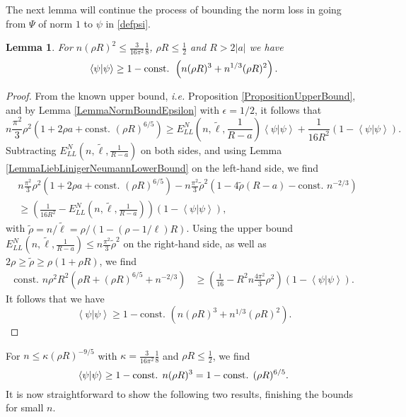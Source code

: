 \documentclass[a4paper,11pt]{article}
\newcommand{\abs}[1]{\left\lvert #1 \right\rvert}
\renewcommand{\braket}[1]{\left\langle#1\right\rangle}
\newcommand{\ie}{\emph{i.e.} }
\newtheorem{lemma}[theorem]{Lemma}
\numberwithin{equation}{section}
\begin{document}
	
	The next lemma will continue the process of bounding the norm loss in going from $ \Psi $ of norm $ 1 $ to $ \psi $ in \eqref{defpsi}. 
	\begin{lemma}\label{LemmaImprovedMassBound}
		For $ n(\rho R)^2\leq  \frac{3}{16\pi^2}\frac{1}{8} $, $ \rho R\leq \frac{1}{2} $ and $ R>2\abs{a} $ we have
		\begin{equation}\label{EqImprovedMassBound}
			\begin{aligned}
				\braket{\psi|\psi} \geq 1-\textnormal{const. }\left(n(\rho R)^3+n^{1/3}(\rho R)^2\right).
			\end{aligned}
		\end{equation}
	\end{lemma}
	\begin{proof}
		From the known upper bound, \ie Proposition \ref{PropositionUpperBound}, and by Lemma \ref{LemmaNormBoundEpsilon} with $ \epsilon=1/2 $, it follows that 
		\begin{equation}
			n\frac{\pi^2}{3}\rho^2\left(1+2\rho a+\text{const. }(\rho R)^{6/5}\right)\geq E_{LL}^N \left(n,\tilde{\ell},\frac{1}{R-a}\right)\braket{\psi|\psi}+ \frac{1}{16R^2}(1-\braket{\psi|\psi}).
		\end{equation}
		Subtracting $ E_{LL}^N \left(n,\tilde{\ell},\frac{1}{R-a}\right) $ on both sides, and using Lemma \ref{LemmaLiebLinigerNeumannLowerBound} on the left-hand side, we find\begin{equation}
			\begin{aligned}
				&n\frac{\pi^2}{3}\rho^2\left(1+2\rho a+\text{const. }(\rho R)^{6/5}\right)-n\frac{\pi^2}{3}\tilde{\rho}^2\left(1-4\tilde{\rho} (R-a)-\text{const. }n^{-2/3}\right)\\
				&\geq  \left(\frac{1}{16R^2}-E_{LL}^N \left(n,\tilde{\ell},\frac{1}{R-a}\right)\right)(1-\braket{\psi|\psi}),
			\end{aligned}
		\end{equation}
		with $ \tilde{\rho}=n/\tilde{\ell}=\rho/(1-(\rho-1/\ell)R)$.
		Using the upper bound $ E^N_{LL}\left(n,\tilde{\ell},\frac{1}{R-a}\right)\leq n\frac{\pi^2}{3}\tilde{\rho}^2 $ on the right-hand side, as well as $ 2\rho \geq\tilde{\rho}\geq \rho(1+\rho R)$, we find
		\begin{equation}
			\begin{aligned}
				\text{const. }n\rho^2R^2\left(\rho R+(\rho R)^{6/5}+n^{-2/3}\right)&\geq \left(\frac{1}{16}-R^2n\frac{4\pi^2}{3}\rho^2\right)\left(1-\braket{\psi|\psi}\right).
			\end{aligned}
		\end{equation}
		It follows that we have \begin{equation}
			\braket{\psi|\psi}\geq 1-\text{const. }\left(n(\rho R)^3+n^{1/3}(\rho R)^2\right).
		\end{equation}
	\end{proof}
	For $ n\leq \kappa (\rho R)^{-9/5} $ with $ \kappa=\frac{3}{16\pi^2}\frac{1}{8} $ and $ \rho R\leq \frac{1}{2} $, we find \begin{equation}
		\braket{\psi|\psi}\geq 1-\textnormal{const. }n(\rho R)^3=1-\textnormal{const. }(\rho R)^{6/5}.
	\end{equation}
	It is now straightforward to show the following two results, finishing the bounds for small $n$.
	
\end{document}
